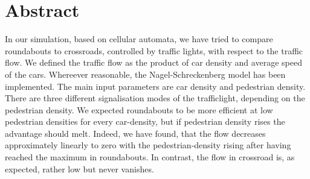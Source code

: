 \section{Abstract}
In our simulation, based on cellular automata, we have tried to compare roundabouts to crossroads, controlled by traffic lights, with respect to the traffic flow. We defined the traffic flow as the product of car density and average speed of the cars. Whereever reasonable, the Nagel-Schreckenberg model \cite{schreckenberg} has been implemented. The main input parameters are car density and pedestrian density. There are three different signalisation modes of the trafficlight, depending on the pedestrian density. We expected roundabouts to be more efficient at low pedestrian densities for every car-density, but if pedestrian density rises the advantage should melt. Indeed, we have found, that the flow decreases approximately linearly to zero with the pedestrian-density rising after having reached the maximum in roundabouts. In contrast, the flow in crossroad is, as expected, rather low but never vanishes. 